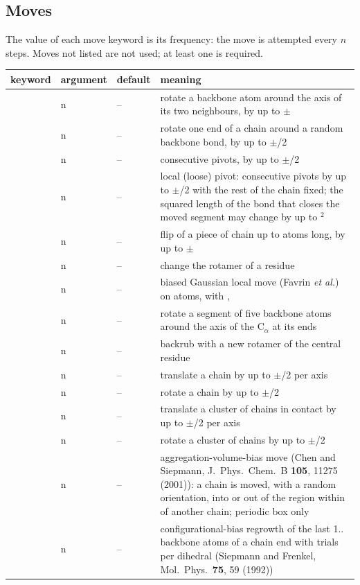 \documentclass[11pt,a4paper]{article}
\newenvironment{keywords}
 {\begin{longtable}{>{\raggedright}p{0.2\textwidth}>{\raggedright}p{0.12\textwidth}>{\raggedright}p{0.14\textwidth}p{0.41\textwidth}}
  \toprule keyword & argument & default & meaning \\ \midrule \endhead
  \bottomrule \endfoot}
 {\end{longtable}}
\newcommand{\key}[4]{\kw{#1} & #2 & #3 & #4 \\}
\begin{document}
\subsection{Moves}
\label{sec:moves}
The value of each move keyword is its frequency: the move is attempted
every $n$ steps. Moves not listed are not used; at least one is required.
\begin{keywords}
\key{flip}{n}{--}{rotate a backbone atom around the axis of its two neighbours, by up to $\pm$\kw{dw_flip}}
\key{pivot}{n}{--}{rotate one end of a chain around a random backbone bond, by up to $\pm$\kw{dw_pivot}/2}
\key{mpivot}{n}{--}{\kw{nmul_mpivot} consecutive pivots, by up to $\pm$\kw{dw_mpivot}/2}
\key{lpivot}{n}{--}{local (loose) pivot: \kw{nmul_lpivot} consecutive pivots by up to $\pm$\kw{dw_lpivot}/2 with the rest of the chain fixed; the squared length of the bond that closes the moved segment may change by up to \kw{r_cloose}$^2$}
\key{mflip}{n}{--}{flip of a piece of chain up to \kw{nmul_mflip} atoms long, by up to $\pm$\kw{dw_mflip}}
\key{sidechain}{n}{--}{change the rotamer of a residue}
\key{movebias}{n}{--}{biased Gaussian local move (Favrin \emph{et al.}) on \kw{nmul_local} atoms, with \kw{bgs_a}, \kw{bgs_b}}
\key{backrub}{n}{--}{rotate a segment of five backbone atoms around the axis of the C$_\alpha$ at its ends}
\key{backsiderub}{n}{--}{backrub with a new rotamer of the central residue}
\key{movecom}{n}{--}{translate a chain by up to $\pm$\kw{dx_com}/2 per axis}
\key{moverot}{n}{--}{rotate a chain by up to $\pm$\kw{dtheta}/2}
\key{comcluster}{n}{--}{translate a cluster of chains in contact by up to $\pm$\kw{dx_clm}/2 per axis}
\key{rotcluster}{n}{--}{rotate a cluster of chains by up to $\pm$\kw{dtheta}/2}
\key{avbmc}{n}{--}{aggregation-volume-bias move (Chen and Siepmann, J.\ Phys.\ Chem.\ B \textbf{105}, 11275 (2001)): a chain is moved, with a random orientation, into or out of the region within \kw{avb_rin} of another chain; periodic box only}
\key{cbmc}{n}{--}{configurational-bias regrowth of the last 1..\kw{nmax_cbmc} backbone atoms of a chain end with \kw{ntrial_cbmc} trials per dihedral (Siepmann and Frenkel, Mol.\ Phys.\ \textbf{75}, 59 (1992))}
\end{keywords}
\end{document}

